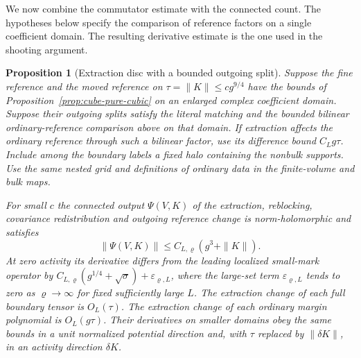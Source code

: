 \documentclass[11pt]{article}
\newtheorem{proposition}[theorem]{Proposition}
\theoremstyle{definition}
\begin{document}
We now combine the commutator estimate with the connected count.
The hypotheses below specify the comparison of reference factors
on a single coefficient domain. The resulting derivative estimate
is the one used in the shooting argument.

\begin{proposition}[Extraction disc with a bounded outgoing split]
\label{prop:cube-bounded-extraction}
Suppose the fine reference and the moved reference on
\(\tau=\|K\|\le c g^{9/4}\) have the bounds of
Proposition~\ref{prop:cube-pure-cubic} on an enlarged complex
coefficient domain. Suppose their outgoing splits satisfy the
literal matching and the bounded bilinear ordinary-reference
comparison above on that domain. If extraction affects the
ordinary reference through such a bilinear factor, use its
difference bound \(C_Lg\tau\). Include among the boundary
labels a fixed halo containing the nonbulk supports. Use the
same nested grid and definitions of ordinary data in the
finite-volume and bulk maps.

For small \(c\) the connected output \(\Psi(V,K)\) of the
extraction, reblocking, covariance redistribution and outgoing
reference change is norm-holomorphic and satisfies
\begin{equation}
 \|\Psi(V,K)\|\le C_{L,\varrho}(g^3+\|K\|).
\end{equation}
At zero activity its derivative differs from the leading
localized small-mark operator by
\(C_{L,\varrho}(g^{1/4}+\sqrt\sigma)+\varepsilon_{\varrho,L}\),
where the large-set term \(\varepsilon_{\varrho,L}\) tends to
zero as \(\varrho\to\infty\) for fixed sufficiently large \(L\).
The extraction change of each full boundary tensor is
\(O_L(\tau)\). The extraction change of each ordinary margin
polynomial is \(O_L(g\tau)\). Their derivatives on smaller
domains obey the same bounds in a unit normalized potential
direction and, with \(\tau\) replaced by \(\|\delta K\|\), in
an activity direction \(\delta K\).
\end{proposition}
\end{document}

